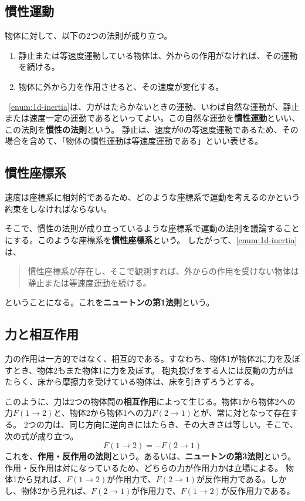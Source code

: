 \documentclass[a4paper, uplatex]{jsarticle}
\numberwithin{equation}{section}
\numberwithin{figure}{section}
\numberwithin{table}{section}
\begin{document}
\subsection{慣性運動}
物体に対して、以下の2つの法則が成り立つ。

\begin{enumerate}
  \item 静止または等速度運動している物体は、外からの作用がなければ、その運動を続ける。\label{enum:1d-inertia}
  \item 物体に外から力を作用させると、その速度が変化する。\label{enum:1d-force}
\end{enumerate}

~\ref{enum:1d-inertia}は、力がはたらかないときの運動、いわば自然な運動が、静止または速度一定の運動であるといってよい。この自然な運動を\textbf{慣性運動}といい、この法則を\textbf{慣性の法則}という。
静止は、速度が0の等速度運動であるため、その場合を含めて、「物体の慣性運動は等速度運動である」といい表せる。

\subsection{慣性座標系}
速度は座標系に相対的であるため、どのような座標系で運動を考えるのかという約束をしなければならない。

そこで、慣性の法則が成り立っているような座標系で運動の法則を議論することにする。このような座標系を\textbf{慣性座標系}という。
したがって、\ref{enum:1d-inertia}は、
\begin{quote}
  慣性座標系が存在し、そこで観測すれば、外からの作用を受けない物体は静止または等速度運動を続ける。
\end{quote}
ということになる。これを\textbf{ニュートンの第1法則}という。

\subsection{力と相互作用}
力の作用は一方的ではなく、相互的である。すなわち、物体1が物体2に力を及ぼすとき、物体2もまた物体1に力を及ぼす。
砲丸投げをする人には反動の力がはたらく、床から摩擦力を受けている物体は、床を引きずろうとする。

このように、力は2つの物体間の\textbf{相互作用}によって生じる。物体1から物体2への力\(F(1 \to 2)\)と、物体2から物体1への力\(F(2 \to 1)\)とが、常に対となって存在する。
2つの力は、同じ方向に逆向きにはたらき、その大きさは等しい。そこで、次の式が成り立つ。
\begin{equation}
  F(1 \to 2) = -F(2 \to 1)
  \label{eq:1d-force}
\end{equation}
これを、\textbf{作用・反作用の法則}という。あるいは、\textbf{ニュートンの第3法則}という。作用・反作用は対になっているため、どちらの力が作用力かは立場による。
物体1から見れば、\(F(1 \to 2)\)が作用力で、\(F(2 \to 1)\)が反作用力である。しかし、物体2から見れば、\(F(2 \to 1)\)が作用力で、\(F(1 \to 2)\)が反作用力である。
\end{document}
